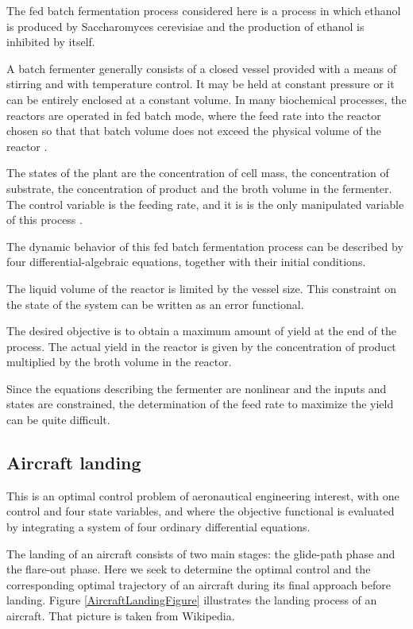The fed batch fermentation process considered here is a process in which
ethanol is produced by Saccharomyces cerevisiae and the production of ethanol
is inhibited by itself.

A batch fermenter generally consists of a closed vessel provided with a
means of stirring and with temperature control. It may be held at constant
pressure or it can be entirely enclosed at a constant volume. In many biochemical processes, 
the reactors are operated in fed batch mode, where the
feed rate into the reactor chosen so that that batch volume does not exceed
the physical volume of the reactor \cite{Luus1993}. 

The states of the plant are the concentration of cell mass, the concentration of substrate, 
the concentration of product and the broth volume in the fermenter. 
The control variable is the feeding rate, and it is
is the only manipulated variable of this process \cite{Luus1993}. 

The dynamic behavior of this fed batch fermentation process can be described by four differential-algebraic equations,
together with their initial conditions. 

The liquid volume of the reactor is limited by the vessel size. This
constraint on the state of the system can be written as an error functional.

The desired objective is to obtain a maximum amount of yield at the end of
the process. The actual yield in the reactor is given by the concentration of
product multiplied by the broth volume in the reactor. 

Since the equations describing the fermenter are nonlinear and the inputs
and states are constrained, the determination of the feed rate to maximize
the yield can be quite difficult.


\subsection*{Aircraft landing}

This is an optimal control problem of aeronautical engineering interest, with one control and
four state variables, and where the objective functional is evaluated by integrating a system of
four ordinary differential equations.

The landing of an aircraft consists of two main stages: the
glide-path phase and the flare-out phase. Here we seek to determine the optimal control and the
corresponding optimal trajectory of an aircraft during its final
approach before landing. 
Figure \ref{AircraftLandingFigure} illustrates the landing process of an aircraft. 
That picture is taken from Wikipedia. 

